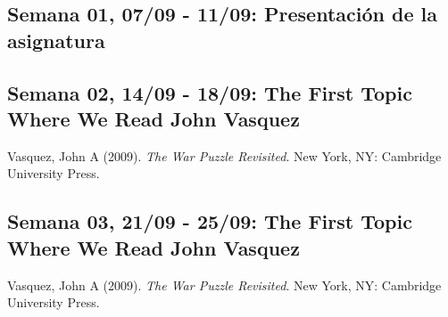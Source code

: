 \documentclass[11pt,]{article}
\begin{document}
\hypertarget{semana-01-0709---1109-presentaciuxf3n-de-la-asignatura}{%
\subsection{Semana 01, 07/09 - 11/09: Presentación de la
asignatura}\label{semana-01-0709---1109-presentaciuxf3n-de-la-asignatura}}

\hypertarget{semana-02-1409---1809-the-first-topic-where-we-read-john-vasquez}{%
\subsection{Semana 02, 14/09 - 18/09: The First Topic Where We Read John
Vasquez}\label{semana-02-1409---1809-the-first-topic-where-we-read-john-vasquez}}

Vasquez, John A (2009). \emph{The War Puzzle Revisited}. New York, NY:
Cambridge University Press.

\hypertarget{semana-03-2109---2509-the-first-topic-where-we-read-john-vasquez}{%
\subsection{Semana 03, 21/09 - 25/09: The First Topic Where We Read John
Vasquez}\label{semana-03-2109---2509-the-first-topic-where-we-read-john-vasquez}}

Vasquez, John A (2009). \emph{The War Puzzle Revisited}. New York, NY:
Cambridge University Press.
\end{document}
